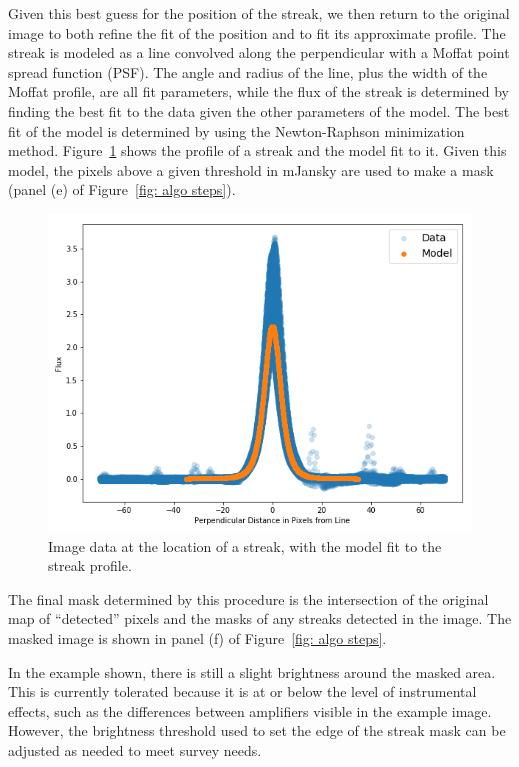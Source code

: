 \documentclass[DM,authoryear,toc]{lsstdoc}
\begin{document}
Given this best guess for the position of the streak, we then return to the original image to both refine the fit of the position and to fit its approximate profile. The streak is modeled as a line convolved along the perpendicular with a Moffat point spread function (PSF). The angle and radius of the line, plus the width of the Moffat profile, are all fit parameters, while the flux of the streak is determined by finding the best fit to the data given the other parameters of the model. The best fit of the model is determined by using the Newton-Raphson minimization method. Figure~\ref{fig: profile} shows the profile of a streak and the model fit to it. Given this model, the pixels above a given threshold in mJansky are used to make a mask (panel (e) of Figure~\ref{fig: algo steps}).
\begin{figure}
\includegraphics[width=\columnwidth]{figures//HSC-R_visit23694_patch3,1_StreakFit.png}
\caption{Image data at the location of a streak, with the model fit to the streak profile.}
\label{fig: profile}
\end{figure}

The final mask determined by this procedure is the intersection of the original map of ``detected'' pixels and the masks of any streaks detected in the image. The masked image is shown in panel (f) of Figure~\ref{fig: algo steps}.

In the example shown, there is still a slight brightness around the masked area. This is currently tolerated because it is at or below the level of instrumental effects, such as the differences between amplifiers visible in the example image. However, the brightness threshold used to set the edge of the streak mask can be adjusted as needed to meet survey needs.
\end{document}
